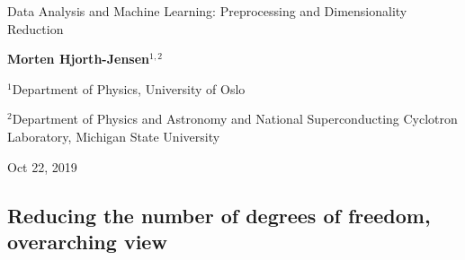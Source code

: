 \documentclass[%
oneside,                 %
final,                   %
10pt]{article}
\begin{document}

\newcommand{\exercisesection}[1]{\subsection*{#1}}






\thispagestyle{empty}

\begin{center}
{\LARGE\bf
\begin{spacing}{1.25}
Data Analysis and Machine Learning: Preprocessing and Dimensionality Reduction
\end{spacing}
}
\end{center}


\begin{center}
{\bf Morten Hjorth-Jensen${}^{1, 2}$} \\ [0mm]
\end{center}

\begin{center}
\centerline{{\small ${}^1$Department of Physics, University of Oslo}}
\centerline{{\small ${}^2$Department of Physics and Astronomy and National Superconducting Cyclotron Laboratory, Michigan State University}}
\end{center}
    

\begin{center}
Oct 22, 2019
\end{center}

\vspace{1cm}


\subsection{Reducing the number of degrees of freedom, overarching view}

\paragraph{}
\end{document}
